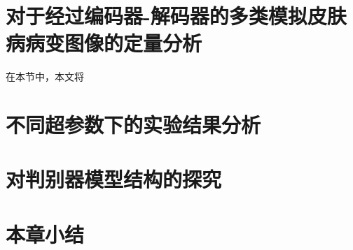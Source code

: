 \section{对于经过编码器-解码器的多类模拟皮肤病病变图像的定量分析}
在本节中，本文将

\section{不同超参数下的实验结果分析}\label{sec:multi_classes_hyper_paras}
\section{对判别器模型结构的探究}
\section{本章小结}
